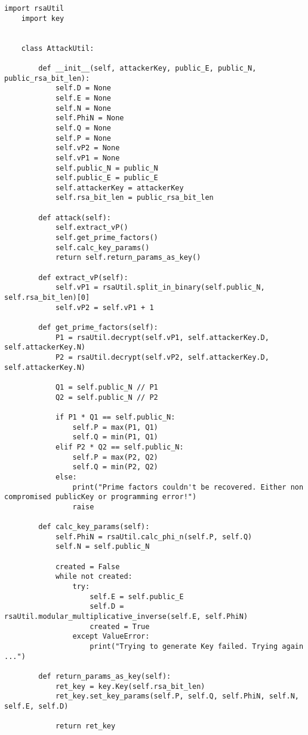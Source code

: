 \begin{lstlisting}[language=PyBrIM]
    import rsaUtil
    import key
    
    
    class AttackUtil:
    
        def __init__(self, attackerKey, public_E, public_N, public_rsa_bit_len):
            self.D = None
            self.E = None
            self.N = None
            self.PhiN = None
            self.Q = None
            self.P = None
            self.vP2 = None
            self.vP1 = None
            self.public_N = public_N
            self.public_E = public_E
            self.attackerKey = attackerKey
            self.rsa_bit_len = public_rsa_bit_len
    
        def attack(self):
            self.extract_vP()
            self.get_prime_factors()
            self.calc_key_params()
            return self.return_params_as_key()
    
        def extract_vP(self):
            self.vP1 = rsaUtil.split_in_binary(self.public_N, self.rsa_bit_len)[0]
            self.vP2 = self.vP1 + 1
    
        def get_prime_factors(self):
            P1 = rsaUtil.decrypt(self.vP1, self.attackerKey.D, self.attackerKey.N)
            P2 = rsaUtil.decrypt(self.vP2, self.attackerKey.D, self.attackerKey.N)
    
            Q1 = self.public_N // P1
            Q2 = self.public_N // P2
    
            if P1 * Q1 == self.public_N:
                self.P = max(P1, Q1)
                self.Q = min(P1, Q1)
            elif P2 * Q2 == self.public_N:
                self.P = max(P2, Q2)
                self.Q = min(P2, Q2)
            else:
                print("Prime factors couldn't be recovered. Either non compromised publicKey or programming error!")
                raise
    
        def calc_key_params(self):
            self.PhiN = rsaUtil.calc_phi_n(self.P, self.Q)
            self.N = self.public_N
    
            created = False
            while not created:
                try:
                    self.E = self.public_E
                    self.D = rsaUtil.modular_multiplicative_inverse(self.E, self.PhiN)
                    created = True
                except ValueError:
                    print("Trying to generate Key failed. Trying again ...")
    
        def return_params_as_key(self):
            ret_key = key.Key(self.rsa_bit_len)
            ret_key.set_key_params(self.P, self.Q, self.PhiN, self.N, self.E, self.D)
    
            return ret_key
\end{lstlisting}

